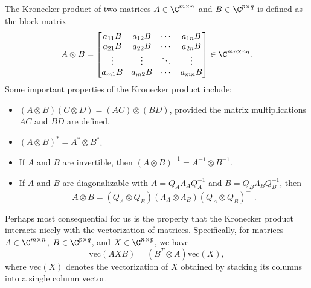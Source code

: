 The Kronecker product of two matrices $A \in \C^{m \times n}$ and $B \in \C^{p \times q}$ is defined as the block matrix
\begin{equation*}
    A \otimes B = \begin{bmatrix}
        a_{11} B & a_{12} B & \cdots & a_{1n} B \\
        a_{21} B & a_{22} B & \cdots & a_{2n} B \\
        \vdots & \vdots & \ddots & \vdots \\
        a_{m1} B & a_{m2} B & \cdots & a_{mn} B
    \end{bmatrix} \in \C^{mp \times nq}.
\end{equation*}
Some important properties of the Kronecker product include:
\begin{itemize}
    \item $(A \otimes B)(C \otimes D) = (AC) \otimes (BD)$, provided the matrix multiplications $AC$ and $BD$ are defined.
    \item $(A \otimes B)^* = A^* \otimes B^*$.
    \item If $A$ and $B$ are invertible, then $(A \otimes B)^{-1} = A^{-1} \otimes B^{-1}$.
    \item If $A$ and $B$ are diagonalizable with $A = Q_A \Lambda_A Q_A^{-1}$ and $B = Q_B \Lambda_B Q_B^{-1}$, then
    \begin{equation*}
        A \otimes B = (Q_A \otimes Q_B)(\Lambda_A \otimes \Lambda_B)(Q_A \otimes Q_B)^{-1}.
    \end{equation*}
\end{itemize}
Perhaps most consequential for us is the property that the Kronecker product interacts nicely with the vectorization of matrices. Specifically, for matrices $A \in \C^{m \times n}$, $B \in \C^{p \times q}$, and $X \in \C^{n \times p}$, we have
\begin{equation}\label{eq:vec-kronecker}
    \text{vec}(AXB) = (B^T \otimes A) \text{vec}(X),
\end{equation}
where $\text{vec}(X)$ denotes the vectorization of $X$ obtained by stacking its columns into a single column vector.









